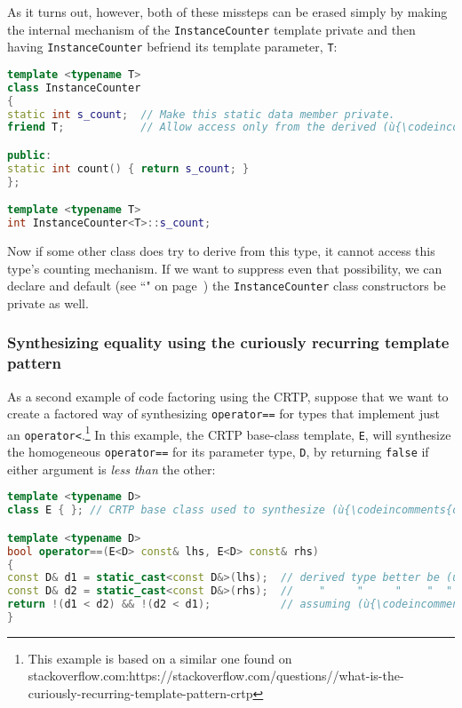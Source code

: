 As it turns out, however, both of these missteps can be erased simply by
making the internal mechanism of the \texttt{InstanceCounter} template
private and then having \mbox{\texttt{InstanceCounter}} befriend its template
parameter, \texttt{T}:

\begin{lstlisting}[language=C++]
template <typename T>
class InstanceCounter
{
static int s_count;  // Make this static data member private.
friend T;            // Allow access only from the derived (ù{\codeincomments{T}}ù).

public:
static int count() { return s_count; }
};

template <typename T>
int InstanceCounter<T>::s_count;
\end{lstlisting}

\noindent Now if some other class does try to derive from this type, it cannot
access this type's counting mechanism. If we want to suppress even that
possibility, we can declare and default (see ``" on page~\pageref{defaulted-special-member-functions}) the \texttt{InstanceCounter}
class constructors be private as well.

\subsubsection[Synthesizing equality using the curiously recurring template pattern]{Synthesizing equality using the curiously recurring template pattern}\label{synthesizing-equality-using-crtp}

As a second example of code factoring using the CRTP, suppose that we want
to create a factored way of synthesizing \texttt{operator==} for types
that implement just an \texttt{operator<}.{\cprotect\footnote{This
example is based on a similar one found on stackoverflow.com:\linebreak[3]
https://\linebreak[3]stackoverflow.\linebreak[3]com/\linebreak[3]questions//what-is-the-curiously-recurring-template-pattern-crtp}}
In this example, the CRTP base-class template, \texttt{E}, will
synthesize the homogeneous \texttt{operator==} for its parameter type,
\texttt{D}, by returning \texttt{false} if either argument is \emph{less
than} the other:

\begin{lstlisting}[language=C++]
template <typename D>
class E { }; // CRTP base class used to synthesize (ù{\codeincomments{operator==}}ù) for (ù{\codeincomments{D}}ù)

template <typename D>
bool operator==(E<D> const& lhs, E<D> const& rhs)
{
const D& d1 = static_cast<const D&>(lhs);  // derived type better be (ù{\codeincomments{D}}ù)
const D& d2 = static_cast<const D&>(rhs);  //    "     "     "    "  "
return !(d1 < d2) && !(d2 < d1);           // assuming (ù{\codeincomments{D}}ù) has an (ù{\codeincomments{operator<}}ù)
}
\end{lstlisting}

